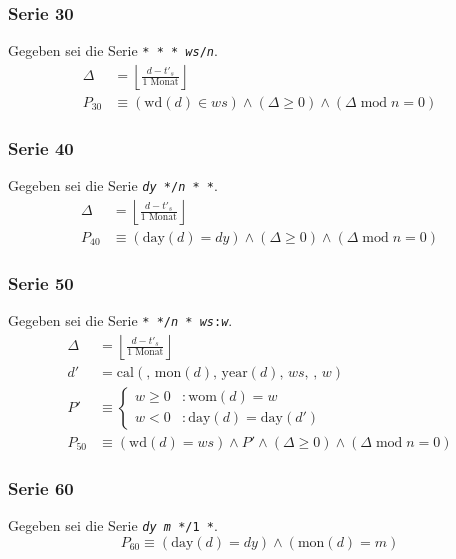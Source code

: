 \documentclass[a4paper]{article}
\newcommand*{\dayf}{\mathrm{day}}
\newcommand*{\monf}{\mathrm{mon}}
\newcommand*{\yearf}{\mathrm{year}}
\newcommand*{\wdf}{\mathrm{wd}}
\newcommand*{\womf}{\mathrm{wom}}
\newcommand*{\calf}{\mathrm{cal}}
\renewcommand{\mod}{\;\mathrm{mod}\;}
\numberwithin{equation}{section}
\begin{document}
\subsubsection{Serie 30}
Gegeben sei die Serie \texttt{* * * \textit{ws}/\textit{n}}.
\begin{equation}
\begin{split}
  \Delta & = \left\lfloor\frac{d - t'_s}{1 \textrm{ Monat}}\right\rfloor \\
  P_{30} & \equiv (\wdf(d) \in ws) \wedge (\Delta \ge 0) \wedge (\Delta \mod n = 0)
\end{split}
\end{equation}

\subsubsection{Serie 40}
Gegeben sei die Serie \texttt{\textit{dy} */\textit{n} * *}.
\begin{equation}
\begin{split}
  \Delta & = \left\lfloor\frac{d - t'_s}{1 \textrm{ Monat}}\right\rfloor \\
  P_{40} & \equiv (\dayf(d) = dy) \wedge (\Delta \ge 0) \wedge (\Delta \mod n = 0)
\end{split}
\end{equation}

\subsubsection{Serie 50}
Gegeben sei die Serie \texttt{* */\textit{n} * \textit{ws}:\textit{w}}.
\begin{equation}
\begin{split}
  \Delta & = \left\lfloor\frac{d - t'_s}{1 \textrm{ Monat}}\right\rfloor \\
  d' & = \calf(,\,\monf(d),\,\yearf(d),\,ws,\,,\,w) \\
  P' & \equiv \left\{\begin{array}{ll}
      w \ge 0 & : \womf(d) = w \\
      w < 0 & : \dayf(d) = \dayf(d')
    \end{array}\right. \\
  P_{50} & \equiv (\wdf(d) = ws) \wedge P' \wedge
    (\Delta \ge 0) \wedge (\Delta \mod n = 0)
\end{split}
\end{equation}

\subsubsection{Serie 60}
Gegeben sei die Serie \texttt{\textit{dy} \textit{m} */1 *}.
\begin{equation}
  P_{60} \equiv (\dayf(d) = dy) \wedge (\monf(d) = m)
\end{equation}
\end{document}
